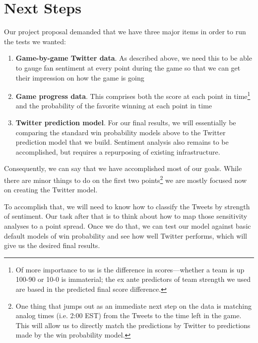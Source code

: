\documentclass[12pt]{article}
\begin{document}
\section*{Next Steps}

Our project proposal demanded that we have three major items in order to run the tests we wanted:
\begin{enumerate}
	\item \textbf{Game-by-game Twitter data}. As described above, we need this to be able to gauge fan sentiment at every point during the game so that we can get their impression on how the game is going
	\item \textbf{Game progress data}. This comprises both the score at each point in time\footnote{Of more importance to us is the difference in scores---whether a team is up 100-90 or 10-0 is immaterial; the ex ante predictors of team strength we used are based in the predicted final score difference.} and the probability of the favorite winning at each point in time
	\item \textbf{Twitter prediction model}. For our final results, we will essentially be comparing the standard win probability models above to the Twitter prediction model that we build. Sentiment analysis also remains to be accomplished, but requires a repurposing of
	existing infrastructure. 
\end{enumerate}

Consequently, we can say that we have accomplished most of our goals. While there are minor things to do on the first two points\footnote{One thing that jumps out as an immediate next step on the data is matching analog times (i.e. 2:00 EST) from the Tweets to the time left in the game. This will allow us to directly match the predictions by Twitter to predictions made by the win probability model.} we are mostly focused now on creating the Twitter model. 

To accomplish that, we will need to know how to classify the Tweets by strength of sentiment. Our task after that is to think about how to map those sensitivity analyses to a point spread. Once we do that, we can test our model against basic default models of win probability and see how well Twitter performs, which will give us the desired final results.  
\end{document}

